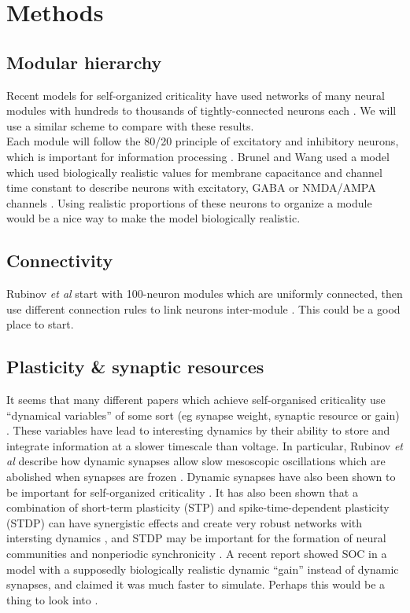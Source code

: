 \documentclass[a4paper, 12pt]{article}
\begin{document}
\section*{Methods}

\subsection*{Modular hierarchy}

Recent models for self-organized criticality have used networks of many neural modules with hundreds to thousands of tightly-connected neurons each \cite{munozlg, rubinov}. We will use a similar scheme to compare with these results.\\

Each module will follow the 80/20 principle of excitatory and inhibitory neurons, which is important for information processing \cite{larremorerestrepo, entropyinhibition}. Brunel and Wang used a model which used biologically realistic values for membrane capacitance and channel time constant to describe neurons with excitatory, GABA or NMDA/AMPA channels \cite{objectworkingmemory}. Using realistic proportions of these neurons to organize a module would be a nice way to make the model biologically realistic.\\

\subsection*{Connectivity}
Rubinov \textit{et al} start with 100-neuron modules which are uniformly connected, then use different connection rules to link neurons inter-module \cite{rubinov}. This could be a good place to start.\\

\subsection*{Plasticity \& synaptic resources}
It seems that many different papers which achieve self-organised criticality use ``dynamical variables'' of some sort (eg synapse weight, synaptic resource or gain) \cite{munozlg, rubinov, kinouchi}. These variables have lead to interesting dynamics by their ability to store and integrate information at a slower timescale than voltage. In particular, Rubinov \textit{et al} describe how dynamic synapses allow slow mesoscopic oscillations which are abolished when synapses are frozen \cite{rubinov}. Dynamic synapses have also been shown to be important for self-organized criticality \cite{dynamicsynapses}. It has also been shown that a combination of short-term plasticity (STP) and spike-time-dependent plasticity (STDP) can have synergistic effects and create very robust networks with intersting dynamics \cite{biologicalsoc}, and STDP may be important for the formation of neural communities and nonperiodic synchronicity \cite{heterogeneousnetwork}. A recent report showed SOC in a model with a supposedly biologically realistic dynamic ``gain'' instead of dynamic synapses, and claimed it was much faster to simulate. Perhaps this would be a thing to look into \cite{kinouchi}.\\
\end{document}
